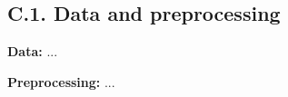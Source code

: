 \subsection{C.1. Data and preprocessing}

\vspace{1cm}
\noindent\textbf{Data:} ... 

\vspace{1cm}
\noindent\textbf{Preprocessing:} ... 
